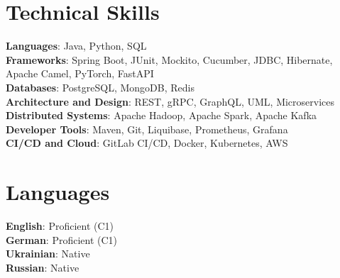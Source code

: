 \documentclass[letterpaper,11pt]{article}
\begin{document}
\section{Technical Skills}
 \begin{itemize}[leftmargin=0.15in, label={}]
    \small{\item{
     \textbf{Languages}{: Java, Python, SQL} \\
     \textbf{Frameworks}{: Spring Boot, JUnit, Mockito, Cucumber, JDBC, Hibernate, Apache Camel, PyTorch, FastAPI} \\
     \textbf{Databases}{: PostgreSQL, MongoDB, Redis}\\
     \textbf{Architecture and Design}{: REST, gRPC, GraphQL, UML, Microservices}\\
     \textbf{Distributed Systems}{: Apache Hadoop, Apache Spark, Apache Kafka}\\
     \textbf{Developer Tools}{: Maven, Git, Liquibase, Prometheus, Grafana} \\
     \textbf{CI/CD and Cloud}{: GitLab CI/CD, Docker, Kubernetes, AWS}\\
    }}
 \end{itemize}


\section{Languages}
 \begin{itemize}[leftmargin=0.15in, label={}]
    \small{\item{
     \textbf{English}{: Proficient (C1)} \\
     \textbf{German}{: Proficient (C1)} \\
     \textbf{Ukrainian}{: Native} \\
     \textbf{Russian}{: Native}
    }}
 \end{itemize}
\end{document}
